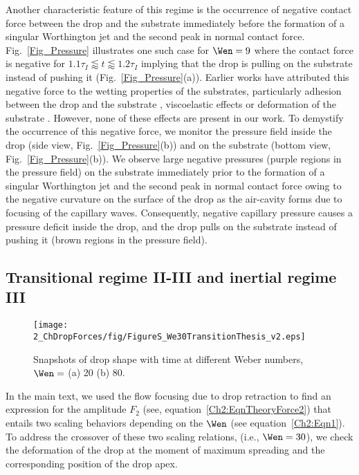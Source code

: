 \begin{subappendices}
	Another characteristic feature of this regime is the occurrence of negative contact force between the drop and the substrate immediately before the formation of a singular Worthington jet and the second peak in normal contact force. Fig.~\ref{Fig_Pressure} illustrates one such case for $\Wen = 9$ where the contact force is negative for $1.1\tau_I \lessapprox t \lessapprox 1.2\tau_I$ implying that the drop is pulling on the substrate instead of pushing it (Fig.~\ref{Fig_Pressure}(a)). Earlier works \cite{grinspan2010impact, li2014, Gordillo2018} have attributed this negative force to the wetting properties of the substrates, particularly adhesion between the drop and the substrate \cite{samuel2011study, liimatainen2017mapping}, viscoelastic effects or deformation of the substrate \cite{Gordillo2018}. However, none of these effects are present in our work. To demystify the occurrence of this negative force, we monitor the pressure field inside the drop (side view, Fig.~\ref{Fig_Pressure}(b)) and on the substrate (bottom view, Fig.~\ref{Fig_Pressure}(b)). We observe large negative pressures (purple regions in the pressure field) on the substrate immediately prior to the formation of a singular Worthington jet and the second peak in normal contact force owing to the negative curvature on the surface of the drop as the air-cavity forms due to focusing of the capillary waves. Consequently, negative capillary pressure causes a pressure deficit inside the drop, and the drop pulls on the substrate instead of pushing it (brown regions in the pressure field).
	
	\subsection{Transitional regime II-III and inertial regime III}
	
	\begin{sidewaysfigure}
		\centering
		\texttt{[image: 2\_ChDropForces/fig/FigureS\_We30TransitionThesis\_v2.eps]}
		\caption{Snapshots of drop shape with time at different Weber numbers, $\Wen = $  (a) 20 (b) 80.}
		\label{Ch2:Fig_Transition}
	\end{sidewaysfigure}
	
	In the main text, we used the flow focusing due to drop retraction to find an expression for the amplitude $F_2$ (see, equation~\eqref{Ch2:EqnTheoryForce2}) that entails two scaling behaviors depending on the $\Wen$ (see equation~\eqref{Ch2:Eqn1}). To address the crossover of these two scaling relations, (i.e., $\Wen = 30$), we check the deformation of the drop at the moment of maximum spreading and the corresponding position of the drop apex. 
	

\end{subappendices}

